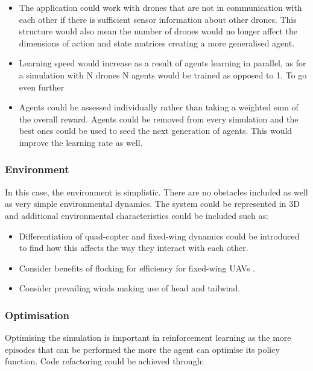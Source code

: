 \begin{itemize}
    \item 
    The application could work with drones that are not in communication with each other if there is sufficient sensor information about other drones. This structure would also mean the number of drones would no longer affect the dimensions of action and state matrices creating a more generalised agent. 
    \item
    Learning speed would increase as a result of agents learning in parallel, as for a simulation with N drones N agents would be trained as opposed to 1. To go even further 
    \item
    Agents could be assessed individually rather than taking a weighted sum of the overall reward. Agents could be removed from every simulation and the best ones could be used to seed the next generation of agents. This would improve the learning rate as well.
\end{itemize}

\subsubsection{Environment}
In this case, the environment is simplistic. There are no obstacles included as well as very simple environmental dynamics. The system could be represented in 3D and additional environmental characteristics could be included such as:

\begin{itemize}
    \item Differentiation of quad-copter\cite{quad1} and fixed-wing\cite{fix1} dynamics could be introduced to find how this affects the way they interact with each other.
    
    
    
    \item Consider benefits of flocking for efficiency for fixed-wing UAVs \cite{fix1}.
    
    \item Consider prevailing winds making use of head and tailwind.
    
\end{itemize}

\subsubsection{Optimisation}
Optimising the simulation is important in reinforcement learning as the more episodes that can be performed the more the agent can optimise its policy function. Code refactoring could be achieved through:


